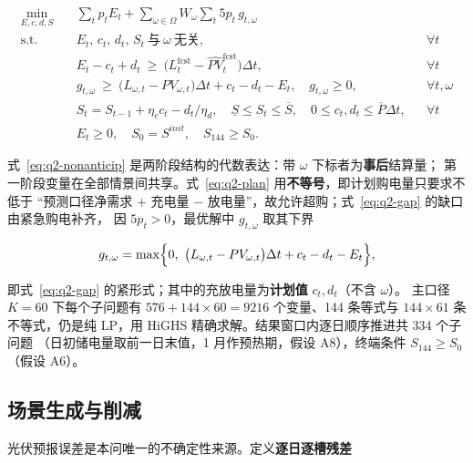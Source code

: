\begin{subequations}\label{eq:q2}
\begin{align}
  \min_{E,c,d,S}\quad
  & \sum_{t}p_tE_t+\sum_{\omega\in\Omega}W_\omega\sum_{t}5p_t\,g_{t,\omega} \label{eq:q2-obj}\\
  \text{s.t.}\quad
  & E_t,\,c_t,\,d_t,\,S_t\ \text{与}\ \omega\ \text{无关}, && \forall t \label{eq:q2-nonanticip}\\
  & E_t-c_t+d_t\ \ge\ \bigl(L^{\text{fcst}}_t-\widehat{PV}^{\text{fcst}}_t\bigr)\Delta t, && \forall t \label{eq:q2-plan}\\
  & g_{t,\omega}\ \ge\ \bigl(L_{\omega,t}-PV_{\omega,t}\bigr)\Delta t+c_t-d_t-E_t,\quad g_{t,\omega}\ge0, && \forall t,\omega \label{eq:q2-gap}\\
  & S_t=S_{t-1}+\eta_cc_t-d_t/\eta_d,\quad \underline S\le S_t\le\overline S,\quad 0\le c_t,d_t\le\overline P\Delta t, && \forall t \label{eq:q2-soc}\\
  & E_t\ge0,\quad S_0=S^{init},\quad S_{144}\ge S_0 . && \label{eq:q2-nonneg}
\end{align}
\end{subequations}

式~\eqref{eq:q2-nonanticip} 是两阶段结构的代数表达：带 \(\omega\) 下标者为\textbf{事后}结算量；
第一阶段变量在全部情景间共享。式~\eqref{eq:q2-plan} 用\textbf{不等号}，即计划购电量只要求不低于
“预测口径净需求 \(+\) 充电量 \(-\) 放电量”，故允许超购；式~\eqref{eq:q2-gap} 的缺口由紧急购电补齐，
因 \(5p_t>0\)，最优解中 \(g_{t,\omega}\) 取其下界

\begin{equation}
  g_{t,\omega}=\max\Bigl\{0,\ \bigl(L_{\omega,t}-PV_{\omega,t}\bigr)\Delta t+c_t-d_t-E_t\Bigr\},
  \label{eq:q2-gapmax}
\end{equation}

即式~\eqref{eq:q2-gap} 的紧形式；其中的充放电量为\textbf{计划值} \(c_t,d_t\)（不含 \(\omega\)）。
主口径 \(K=60\) 下每个子问题有 \(576+144\times60=9216\) 个变量、144 条等式与
\(144\times61\) 条不等式，仍是纯 LP，用 HiGHS 精确求解。结果窗口内逐日顺序推进共 334 个子问题
（日初储电量取前一日末值，1 月作预热期，假设 A8），终端条件 \(S_{144}\ge S_0\)（假设 A6）。

\subsection{场景生成与削减}\label{sec:q2-scen}

光伏预报误差是本问唯一的不确定性来源。定义\textbf{逐日逐槽残差}

